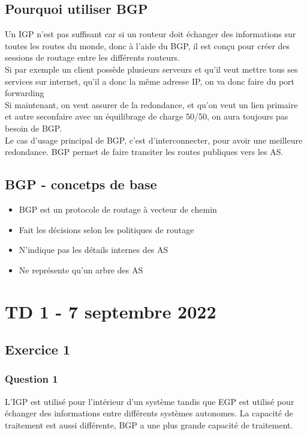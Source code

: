 \documentclass[12pt, a4paper]{article}
\begin{document}
\subsection{Pourquoi utiliser BGP}
    Un IGP n'est pas suffisant car si un routeur doit échanger des informations
    sur toutes les routes du monde, donc à l'aide du BGP, il est conçu pour
    créer des sessions de routage entre les différents routeurs.\\

    Si par exemple un client possède plusieurs serveurs et qu'il veut mettre 
    tous ses services sur internet, qu'il a donc la même adresse IP, on va 
    donc faire du port forwarding\\

    Si maintenant, on veut assurer de la redondance, et qu'on veut un lien
    primaire et autre seconfaire avec un équilibrage de charge 50/50, on aura
    toujours pas besoin de BGP. \\
    
    Le cas d'usage principal de BGP, c'est d'interconnecter, pour avoir une meilleure
    redondance. 
    BGP permet de faire transiter les routes publiques vers les AS.
    \newpage

    \subsection{BGP - concetps de base}
    \begin{itemize}
        \item BGP est un protocole de routage à vecteur de chemin
        \item Fait les décisions selon les politiques de routage
        \item N'indique pas les détails internes des AS
        \item Ne représente qu'un arbre des AS
        
    \end{itemize}
\newpage  
\section{TD 1 - 7 septembre 2022}
\subsection{Exercice 1}
    \subsubsection{Question 1}
    L'IGP est utilisé pour l'intérieur d'un système tandis que EGP est utilisé
    pour échanger des informations entre différents systèmes autonomes. 
    La capacité de traitement est aussi différente, BGP a une plus grande capacité de 
    traitement. 
    
\end{document}
